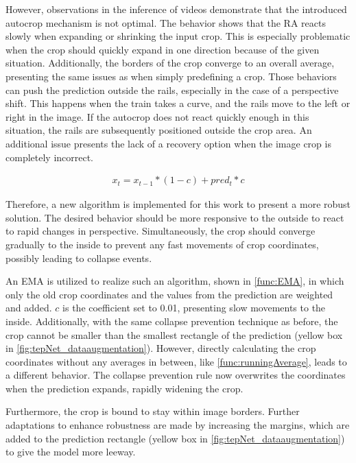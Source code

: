 \noindent However, observations in the inference of videos demonstrate that the introduced autocrop mechanism is not optimal. The behavior shows that the \ac{RA} reacts slowly when expanding or shrinking the input crop. This is especially problematic when the crop should quickly expand in one direction because of the given situation. Additionally, the borders of the crop converge to an overall average, presenting the same issues as when simply predefining a crop. Those behaviors can push the prediction outside the rails, especially in the case of a perspective shift. This happens when the train takes a curve, and the rails move to the left or right in the image. If the autocrop does not react quickly enough in this situation, the rails are subsequently positioned outside the crop area. An additional issue presents the lack of a recovery option when the image crop is completely incorrect.

\begin{align}
    x_t =  x_{t-1} * (1 - c) + pred_t * c
    \label{func:EMA}
\end{align}

\vspace{0.7cm}

\noindent Therefore, a new algorithm is implemented for this work to present a more robust solution.
The desired behavior should be more responsive to the outside to react to rapid changes in perspective.
Simultaneously, the crop should converge gradually to the inside to prevent any fast movements of crop coordinates, possibly leading to collapse events.

An \ac{EMA} is utilized to realize such an algorithm, shown in \autoref{func:EMA}, in which only the old crop coordinates and the values from the prediction are weighted and added.
$c$ is the coefficient set to 0.01, presenting slow movements to the inside.
Additionally, with the same collapse prevention technique as before, the crop cannot be smaller than the smallest rectangle of the prediction (yellow box in \autoref{fig:tepNet_dataaugmentation}).
However, directly calculating the crop coordinates without any averages in between, like \autoref{func:runningAverage}, leads to a different behavior.
The collapse prevention rule now overwrites the coordinates when the prediction expands, rapidly widening the crop.

Furthermore, the crop is bound to stay within image borders.
Further adaptations to enhance robustness are made by increasing the margins, which are added to the prediction rectangle (yellow box in \autoref{fig:tepNet_dataaugmentation}) to give the model more leeway.

